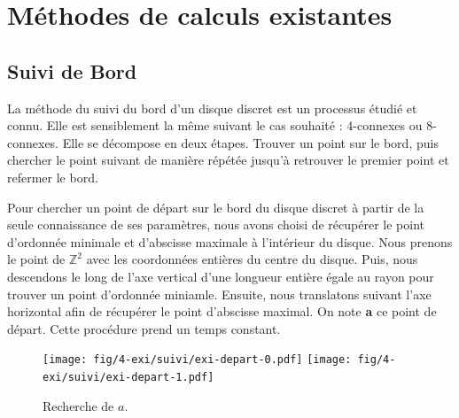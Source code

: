 \section{Méthodes de calculs existantes}

\subsection{Suivi de Bord}

La méthode du suivi du bord d'un disque discret est un processus étudié et connu. Elle est sensiblement la même suivant le cas souhaité : 4-connexes ou 8-connexes. Elle se décompose en deux étapes. Trouver un point sur le bord, puis chercher le point suivant de manière répétée jusqu'à retrouver le premier point et refermer le bord.


Pour chercher un point de départ sur le bord du disque discret à partir de la seule connaissance de ses paramètres, nous avons choisi de récupérer le point d'ordonnée minimale et d'abscisse maximale à l'intérieur du disque. Nous prenons le point de $\mathbb{Z}^2$ avec les coordonnées entières du centre du disque. Puis, nous descendons le long de l'axe vertical d'une longueur entière égale au rayon pour trouver un point d'ordonnée miniamle. Ensuite, nous translatons suivant l'axe horizontal afin de récupérer le point d'abscisse maximal. On note \textbf{a} ce point de départ. Cette procédure prend un temps constant. 

\begin{figure}[H]
  \centering
  \texttt{[image: fig/4-exi/suivi/exi-depart-0.pdf]}
  \texttt{[image: fig/4-exi/suivi/exi-depart-1.pdf]}
  \caption{Recherche de $a$.}
\end{figure}
  


